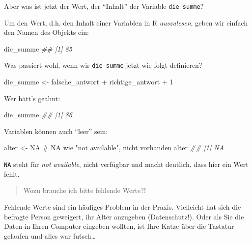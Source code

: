 \documentclass[
  letterpaper,
  twoside,
  open=any]{scrbook}
\newenvironment{Shaded}{\begin{snugshade}}{\end{snugshade}}
\newcommand{\CommentTok}[1]{\textcolor[rgb]{0.37,0.37,0.37}{#1}}
\newcommand{\ConstantTok}[1]{\textcolor[rgb]{0.56,0.35,0.01}{#1}}
\newcommand{\DecValTok}[1]{\textcolor[rgb]{0.68,0.00,0.00}{#1}}
\newcommand{\DocumentationTok}[1]{\textcolor[rgb]{0.37,0.37,0.37}{\textit{#1}}}
\newcommand{\NormalTok}[1]{\textcolor[rgb]{0.00,0.23,0.31}{#1}}
\newcommand{\OtherTok}[1]{\textcolor[rgb]{0.00,0.23,0.31}{#1}}
\newcommand{\SpecialCharTok}[1]{\textcolor[rgb]{0.37,0.37,0.37}{#1}}
\theoremstyle{definition}
\theoremstyle{definition}
\theoremstyle{definition}
\theoremstyle{remark}
\begin{document}
Aber was ist jetzt der Wert, der \enquote{Inhalt} der Variable
\texttt{die\_summe}?

Um den Wert, d.h. den Inhalt einer Variablen in R \emph{auszulesen},
geben wir einfach den Namen des Objekts ein:

\begin{Shaded}
\begin{Highlighting}[]
\NormalTok{die\_summe}
\DocumentationTok{\#\# [1] 85}
\end{Highlighting}
\end{Shaded}

Was passiert wohl, wenn wir \texttt{die\_summe} jetzt wie folgt
definieren?

\begin{Shaded}
\begin{Highlighting}[]
\NormalTok{die\_summe }\OtherTok{\textless{}{-}}\NormalTok{ falsche\_antwort }\SpecialCharTok{+}\NormalTok{ richtige\_antwort }\SpecialCharTok{+} \DecValTok{1}
\end{Highlighting}
\end{Shaded}

Wer hätt's geahnt:

\begin{Shaded}
\begin{Highlighting}[]
\NormalTok{die\_summe}
\DocumentationTok{\#\# [1] 86}
\end{Highlighting}
\end{Shaded}

Variablen können auch \enquote{leer} sein:

\begin{Shaded}
\begin{Highlighting}[]
\NormalTok{alter }\OtherTok{\textless{}{-}} \ConstantTok{NA}  \CommentTok{\# NA wie "not available", nicht vorhanden}
\NormalTok{alter}
\DocumentationTok{\#\# [1] NA}
\end{Highlighting}
\end{Shaded}

\texttt{NA} steht für \emph{not available}, nicht verfügbar und macht
deutlich, dass hier ein Wert fehlt.

\begin{quote}
{} Wozu brauche ich bitte fehlende Werte?!
\end{quote}

Fehlende Werte sind ein häufiges Problem in der Praxis. Vielleicht hat
sich die befragte Person geweigert, ihr Alter anzugeben (Datenschutz!).
Oder als Sie die Daten in Ihren Computer eingeben wollten, ist Ihre
Katze über die Tastatur gelaufen und alles war futsch\ldots{}
\end{document}
